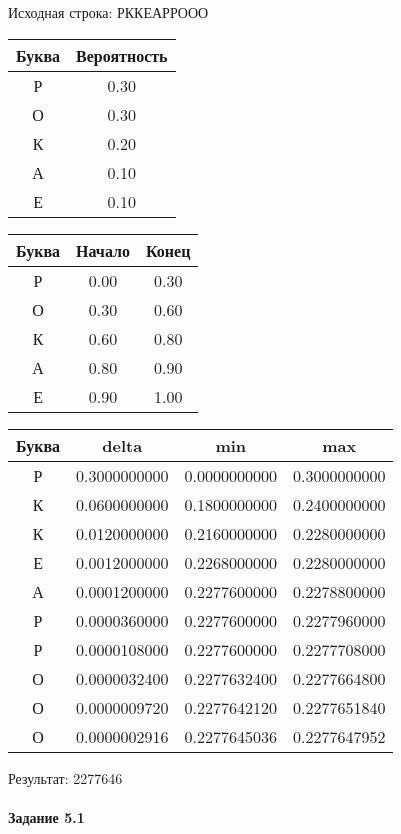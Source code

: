 \documentclass[a4paper, 12pt]{article}
\begin{document}
Исходная строка: РККЕАРРООО\
\begin{center}
 \begin{tabular}{ |c|c| } 
  \hline
     Буква & Вероятность \\ \hline
Р & 0.30\\\hline
О & 0.30\\\hline
К & 0.20\\\hline
А & 0.10\\\hline
Е & 0.10
\\ \hline \end{tabular}
\end{center}
\begin{center}
 \begin{tabular}{ |c|c|c| } 
  \hline
     Буква & Начало & Конец \\ \hline
Р & 0.00 & 0.30\\\hline
О & 0.30 & 0.60\\\hline
К & 0.60 & 0.80\\\hline
А & 0.80 & 0.90\\\hline
Е & 0.90 & 1.00
\\ \hline \end{tabular}
\end{center}
\begin{center}
 \begin{tabular}{ |c|c|c|c| } 
  \hline
     Буква & delta & min & max \\ \hline
Р & 0.3000000000 & 0.0000000000 & 0.3000000000\\\hline
К & 0.0600000000 & 0.1800000000 & 0.2400000000\\\hline
К & 0.0120000000 & 0.2160000000 & 0.2280000000\\\hline
Е & 0.0012000000 & 0.2268000000 & 0.2280000000\\\hline
А & 0.0001200000 & 0.2277600000 & 0.2278800000\\\hline
Р & 0.0000360000 & 0.2277600000 & 0.2277960000\\\hline
Р & 0.0000108000 & 0.2277600000 & 0.2277708000\\\hline
О & 0.0000032400 & 0.2277632400 & 0.2277664800\\\hline
О & 0.0000009720 & 0.2277642120 & 0.2277651840\\\hline
О & 0.0000002916 & 0.2277645036 & 0.2277647952
\\ \hline \end{tabular}
\end{center}
Результат: 2277646
\pagebreak
\paragraph{Задание 5.1}
\end{document}
